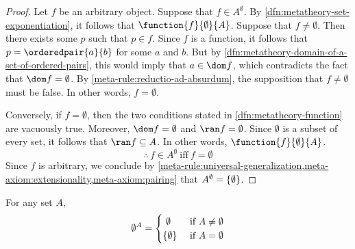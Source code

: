 \begin{proof}
    Let \( f \) be an arbitrary object.
    Suppose that \( f \in A^{\emptyset} \).
    By \cref{dfn:metatheory-set-exponentiation}, it follows that \( \function{f}{\emptyset}{A} \).
    Suppose that \( f \neq \emptyset \). Then there exists some \( p \) such that \( p \in f \).
    Since \( f \) is a function, it follows that \( p = \orderedpair{a}{b} \) for some \( a \) and \( b \).
    But by \cref{dfn:metatheory-domain-of-a-set-of-ordered-pairs}, this would imply that \( a \in \dom f \), which contradicts the fact
    that \( \dom f = \emptyset \).
    By \cref{meta-rule:reductio-ad-absurdum}, the supposition that \( f \neq \emptyset \) must be false.
    In other words, \( f = \emptyset \).
    
    \vspace{0.3cm}
    \noindent
    Conversely, if \( f = \emptyset \), then the two conditions stated in \cref{dfn:metatheory-function} are vacuously true.
    Moreover, \( \dom f = \emptyset \) and \( \ran f = \emptyset \).
    Since \( \emptyset \) is a subset of every set, it follows that \( \ran f \subseteq A \).
    In other words, \( \function{f}{\emptyset}{A} \).
    \begin{equation*}
        \therefore \, f \in A^{\emptyset} \ \text{iff} \ f = \emptyset
    \end{equation*}
    Since \( f \) is arbitrary, we conclude by \cref{meta-rule:universal-generalization,meta-axiom:extensionality,meta-axiom:pairing}
    that \( A^{\emptyset} = \mleft\{ \emptyset \mright\} \).
\end{proof}

\begin{thm}
     \label{thm:metatheory-exponentiation-with-empty-base}
    For any set \( A \),
    \begin{equation*}
        \emptyset^{A} =
        \begin{cases}
            \ \emptyset \ &\text{if} \ A \neq \emptyset\\            
            \mleft\{ \emptyset \mright\} \ &\text{if} \ A = \emptyset
        \end{cases}
    \end{equation*}
\end{thm}

